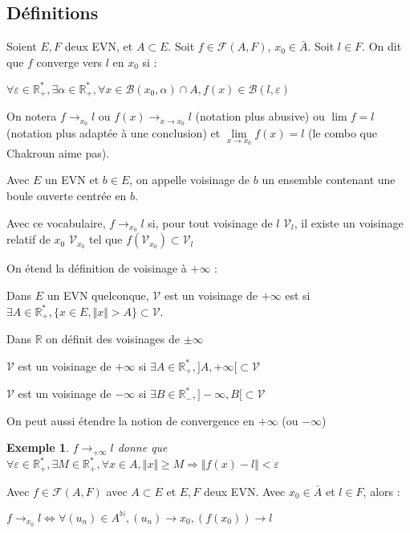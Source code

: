 \documentclass[a4paper,12pt]{book}
\newcommand{\Def}[2]{\begin{tcolorbox}[sharp corners, colback=white,colframe=blue!90!black!75, title=Définition : #1]#2\end{tcolorbox}}
\newcommand{\Prop}[2]{\begin{tcolorbox}[sharp corners, colback=white,colframe=red!90!black!75, title=Proposition : #1]#2\end{tcolorbox}}
\newtheorem{Exe}{Exemple}[section]
\def\R{\mathbb{R}}
\def\N{\mathbb{N}}
\begin{document}
\subsection{Définitions}
\Def{Limite}{Soient $E,F$ deux EVN, et $A\subset E$. Soit $f\in\mathcal{F}(A,F)$, $x_0\in\bar{A}$. Soit $l\in F$. On dit que $f$ converge vers $l$ en $x_0$ si :
\par \begin{center} $\forall\varepsilon\in\R_+^*,\exists\alpha\in\R_+^*,\forall x\in\mathcal{B}(x_0,\alpha)\cap A, f(x)\in\mathcal{B}(l,\varepsilon)$ \end{center}
\par On notera $f\to_{x_0} l$ ou $f(x)\to_{x\to x_0} l$ (notation plus abusive) ou $\lim f = l$ (notation plus adaptée à une conclusion) et $\lim\limits_{x\to x_0}f(x)=l$ (le combo que Chakroun aime pas).}
\Def{Vocabulaire du voisinage}{Avec $E$ un EVN et $b\in E$, on appelle voisinage de $b$ un ensemble contenant une boule ouverte centrée en $b$.
\par Avec ce vocabulaire, $f\to_{x_0} l$ si, pour tout voisinage de $l$ $\mathcal{V}_l$, il existe un voisinage relatif de $x_0$ $\mathcal{V}_{x_0}$ tel que $f(\mathcal{V}_{x_0})\subset\mathcal{V}_l$
\par On étend la définition de voisinage à $+\infty$ :
\par Dans $E$ un EVN quelconque, $\mathcal{V}$ est un voisinage de $+\infty$ est si $\exists A\in\R_+^*,\{x\in E, \Vert x\Vert>A\}\subset\mathcal{V}$.
\par Dans $\R$ on définit des voisinages de $\pm\infty$
\par $\mathcal{V}$ est un voisinage de $+\infty$ si $\exists A\in\R_+^*, ]A,+\infty[\subset\mathcal{V}$
\par $\mathcal{V}$ est un voisinage de $-\infty$ si $\exists B\in\R_-^*, ]-\infty, B[\subset\mathcal{V}$
\par On peut aussi étendre la notion de convergence en $+\infty$ (ou $-\infty$)}
\begin{Exe}
$f\to_{+\infty} l$ donne que $\forall\varepsilon\in\R_+^*,\exists M\in\R_+^*,\forall x\in A, \Vert x\Vert\geq M\Rightarrow \Vert f(x)-l\Vert<\varepsilon$
\end{Exe}
\Prop{Caractérisation séquentielle de la limite}{Avec $f\in\mathcal{F}(A,F)$ avec $A\subset E$ et $E,F$ deux EVN. Avec $x_0\in\bar{A}$ et $l\in F$, alors :
\par \begin{center}$f\rightarrow_{x_0}l\Leftrightarrow \forall (u_n)\in A^\N, (u_n)\to x_0, (f(x_0))\to l$ \end{center}}
\end{document}
